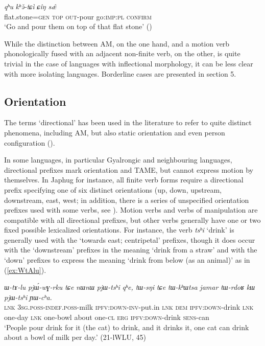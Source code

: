 \documentclass[oneside,a4paper,11pt]{article}
\newcommand{\ipa}[1]{{\phon\textit{#1}}}
\begin{document}
\begin{exe}
\ex \label{ex:khEtCi}
 \gll  \ipa{ɡʉtɑpǽŋ=ɡæ}  \ipa{qʰu}  \ipa{kʰə̌-tɕì}  \ipa{ɕîŋ}  \ipa{sæ̂} \\
flat.stone=\textsc{gen} \textsc{top} \textsc{out}-pour go:\textsc{imp}:\textsc{pl} \textsc{confirm}   \\
\glt `Go and pour them on top of that flat stone' (\citealt[568]{daudey14grammar})
\end{exe}

While the distinction between AM, on the one hand, and a motion verb phonologically fused with an adjacent non-finite verb, on the other, is quite trivial in the case of languages with inflectional morphology, it can be less clear with more isolating languages.  Borderline cases are presented in section 5.

\subsection{Orientation}
The terms `directional' has been used in the literature to refer to quite distinct phenomena, including AM, but also static orientation and even person configuration (\citealt[20]{zuniga06}). 

In some languages, in particular Gyalrongic and neighbouring languages, directional prefixes mark orientation  and TAME, but cannot express motion by themselves. In Japhug for instance, all finite verb forms require a directional prefix specifying one of six distinct orientations (up, down, upstream, downstream, east, west; in addition, there is a series of unspecified orientation prefixes used with some verbs, see \citealt{jacques17sketch}). Motion verbs and verbs of manipulation are compatible with all directional prefixes, but other verbs generally have one or two fixed possible lexicalized orientations. For instance, the verb \ipa{tsʰi} `drink' is generally used with the `towards east; centripetal' prefixes, though it does occur with the `downstream' prefixes in the meaning `drink from a straw' and with the `down' prefixes to express the meaning `drink from below (as an animal)' as in (\ref{ex:WtAlu}). 

  \begin{exe}
\ex \label{ex:WtAlu}
 \gll \ipa{tɕe} 	\ipa{ɯ-tɤ-lu} 	\ipa{pjɯ́-wɣ-rku} 	\ipa{tɕe} 	\ipa{nɯnɯ} 	\ipa{pjɯ-tsʰi} 	\ipa{qʰe,} 	\ipa{tɯ-sŋi} 	\ipa{tɕe} 	\ipa{tɯ-kʰɯtsa} 	\ipa{jamar} 	\ipa{tɯ-rdoʁ} 	\ipa{kɯ} 	\ipa{pjɯ-tsʰi} 	\ipa{ɲɯ-cʰa.}  \\
\textsc{lnk} \textsc{3sg.poss}-\textsc{indef.poss}-milk \textsc{ipfv}:\textsc{down}-\textsc{inv}-put.in  \textsc{lnk} \textsc{dem} \textsc{ipfv}:\textsc{down}-drink \textsc{lnk} one-day \textsc{lnk} one-bowl about one-\textsc{cl} \textsc{erg} \textsc{ipfv}:\textsc{down}-drink \textsc{sens}-can \\
\glt `People pour drink for it (the cat) to drink, and it drinks it, one cat can drink about a bowl of milk per day.' (21-lWLU, 45)
  \end{exe}
\end{document}
